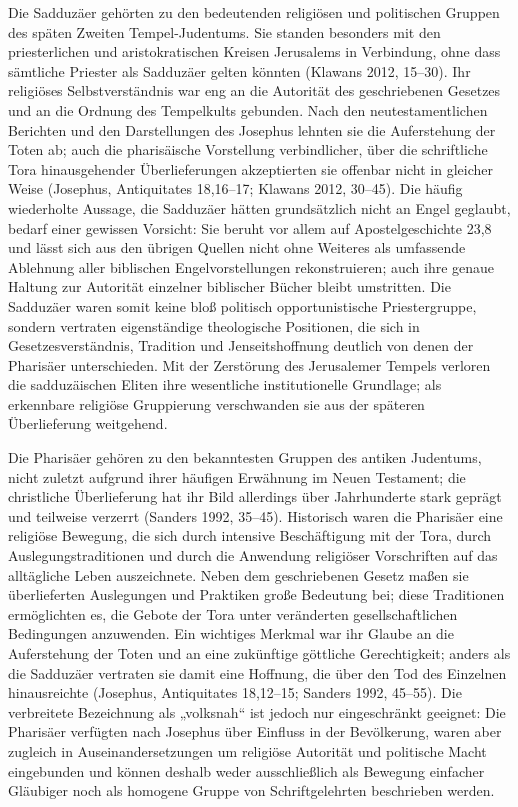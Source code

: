 \documentclass[fontsize=12pt]{mybib}
\begin{document}
Die Sadduzäer gehörten zu den bedeutenden religiösen und politischen Gruppen des späten Zweiten Tempel-Judentums. Sie standen besonders mit den priesterlichen und aristokratischen Kreisen Jerusalems in Verbindung, ohne dass sämtliche Priester als Sadduzäer gelten könnten (Klawans 2012, 15–30). Ihr religiöses Selbstverständnis war eng an die Autorität des geschriebenen Gesetzes und an die Ordnung des Tempelkults gebunden. Nach den neutestamentlichen Berichten und den Darstellungen des Josephus lehnten sie die Auferstehung der Toten ab; auch die pharisäische Vorstellung verbindlicher, über die schriftliche Tora hinausgehender Überlieferungen akzeptierten sie offenbar nicht in gleicher Weise (Josephus, Antiquitates 18,16–17; Klawans 2012, 30–45). Die häufig wiederholte Aussage, die Sadduzäer hätten grundsätzlich nicht an Engel geglaubt, bedarf einer gewissen Vorsicht: Sie beruht vor allem auf Apostelgeschichte 23,8 und lässt sich aus den übrigen Quellen nicht ohne Weiteres als umfassende Ablehnung aller biblischen Engelvorstellungen rekonstruieren; auch ihre genaue Haltung zur Autorität einzelner biblischer Bücher bleibt umstritten. Die Sadduzäer waren somit keine bloß politisch opportunistische Priestergruppe, sondern vertraten eigenständige theologische Positionen, die sich in Gesetzesverständnis, Tradition und Jenseitshoffnung deutlich von denen der Pharisäer unterschieden. Mit der Zerstörung des Jerusalemer Tempels verloren die sadduzäischen Eliten ihre wesentliche institutionelle Grundlage; als erkennbare religiöse Gruppierung verschwanden sie aus der späteren Überlieferung weitgehend.

Die Pharisäer gehören zu den bekanntesten Gruppen des antiken Judentums, nicht zuletzt aufgrund ihrer häufigen Erwähnung im Neuen Testament; die christliche Überlieferung hat ihr Bild allerdings über Jahrhunderte stark geprägt und teilweise verzerrt (Sanders 1992, 35–45). Historisch waren die Pharisäer eine religiöse Bewegung, die sich durch intensive Beschäftigung mit der Tora, durch Auslegungstraditionen und durch die Anwendung religiöser Vorschriften auf das alltägliche Leben auszeichnete. Neben dem geschriebenen Gesetz maßen sie überlieferten Auslegungen und Praktiken große Bedeutung bei; diese Traditionen ermöglichten es, die Gebote der Tora unter veränderten gesellschaftlichen Bedingungen anzuwenden. Ein wichtiges Merkmal war ihr Glaube an die Auferstehung der Toten und an eine zukünftige göttliche Gerechtigkeit; anders als die Sadduzäer vertraten sie damit eine Hoffnung, die über den Tod des Einzelnen hinausreichte (Josephus, Antiquitates 18,12–15; Sanders 1992, 45–55). Die verbreitete Bezeichnung als „volksnah“ ist jedoch nur eingeschränkt geeignet: Die Pharisäer verfügten nach Josephus über Einfluss in der Bevölkerung, waren aber zugleich in Auseinandersetzungen um religiöse Autorität und politische Macht eingebunden und können deshalb weder ausschließlich als Bewegung einfacher Gläubiger noch als homogene Gruppe von Schriftgelehrten beschrieben werden.
\end{document}
